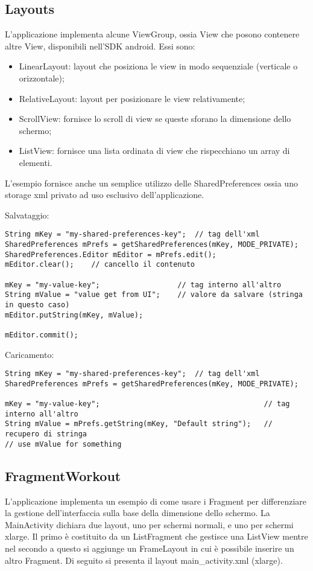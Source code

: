 \subsection{Layouts}
L'applicazione implementa alcune ViewGroup, ossia View che posono contenere altre View, disponibili nell'SDK android. Essi sono:
\begin{itemize}
	\item LinearLayout: layout che posiziona le view in modo sequenziale (verticale o orizzontale);
	\item RelativeLayout: layout per posizionare le view relativamente;
	\item ScrollView: fornisce lo scroll di view se queste sforano la dimensione dello schermo;
	\item ListView: fornisce una lista ordinata di view che rispecchiano un array di elementi.
\end{itemize}

L'esempio fornisce anche un semplice utilizzo delle SharedPreferences ossia uno storage xml privato ad uso esclusivo dell'applicazione.

Salvataggio:
\begin{lstlisting}
String mKey = "my-shared-preferences-key";	// tag dell'xml
SharedPreferences mPrefs = getSharedPreferences(mKey, MODE_PRIVATE);
SharedPreferences.Editor mEditor = mPrefs.edit();
mEditor.clear();	// cancello il contenuto

mKey = "my-value-key";					// tag interno all'altro
String mValue = "value get from UI";	// valore da salvare (stringa in questo caso)
mEditor.putString(mKey, mValue);		

mEditor.commit();
\end{lstlisting}

Caricamento:
\begin{lstlisting}
String mKey = "my-shared-preferences-key";	// tag dell'xml
SharedPreferences mPrefs = getSharedPreferences(mKey, MODE_PRIVATE);

mKey = "my-value-key";										// tag interno all'altro
String mValue = mPrefs.getString(mKey, "Default string");	// recupero di stringa
// use mValue for something
\end{lstlisting}


\subsection{FragmentWorkout}
L'applicazione implementa un esempio di come usare i Fragment per differenziare la gestione dell'interfaccia sulla base della dimensione dello schermo.
La MainActivity dichiara due layout, uno per schermi normali, e uno per schermi xlarge. Il primo è costituito da un ListFragment che gestisce una ListView mentre nel secondo a questo si aggiunge un FrameLayout in cui è possibile inserire un altro Fragment. Di seguito si presenta il layout main_activity.xml (xlarge).

